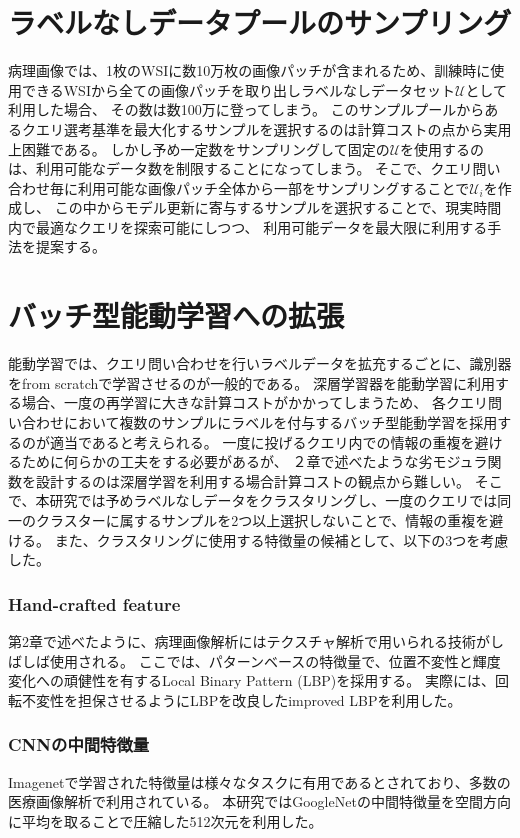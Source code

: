 \section{ラベルなしデータプールのサンプリング}
病理画像では、1枚のWSIに数10万枚の画像パッチが含まれるため、訓練時に使用できるWSIから全ての画像パッチを取り出しラベルなしデータセット$\mathcal{U}$として利用した場合、
その数は数100万に登ってしまう。
このサンプルプールからあるクエリ選考基準を最大化するサンプルを選択するのは計算コストの点から実用上困難である。
しかし予め一定数をサンプリングして固定の$\mathcal{U}$を使用するのは、利用可能なデータ数を制限することになってしまう。
そこで、クエリ問い合わせ毎に利用可能な画像パッチ全体から一部をサンプリングすることで$\mathcal{U}_i$を作成し、
この中からモデル更新に寄与するサンプルを選択することで、現実時間内で最適なクエリを探索可能にしつつ、
利用可能データを最大限に利用する手法を提案する。

\section{バッチ型能動学習への拡張}
能動学習では、クエリ問い合わせを行いラベルデータを拡充するごとに、識別器をfrom scratchで学習させるのが一般的である。
深層学習器を能動学習に利用する場合、一度の再学習に大きな計算コストがかかってしまうため、
各クエリ問い合わせにおいて複数のサンプルにラベルを付与するバッチ型能動学習を採用するのが適当であると考えられる。
一度に投げるクエリ内での情報の重複を避けるために何らかの工夫をする必要があるが、
２章で述べたような劣モジュラ関数を設計するのは深層学習を利用する場合計算コストの観点から難しい。
そこで、本研究では予めラベルなしデータをクラスタリングし、一度のクエリでは同一のクラスターに属するサンプルを2つ以上選択しないことで、情報の重複を避ける。
また、クラスタリングに使用する特徴量の候補として、以下の3つを考慮した。

\subsubsection{Hand-crafted feature}
第2章で述べたように、病理画像解析にはテクスチャ解析で用いられる技術がしばしば使用される。
ここでは、パターンベースの特徴量で、位置不変性と輝度変化への頑健性を有するLocal Binary Pattern (LBP)\cite{ojala2002multiresolution}を採用する。
実際には、回転不変性を担保させるようにLBPを改良したimproved LBPを利用した。

\subsubsection{CNNの中間特徴量}
Imagenetで学習された特徴量は様々なタスクに有用であるとされており、多数の医療画像解析で利用されている。
本研究ではGoogleNet\cite{szegedy2015going}の中間特徴量を空間方向に平均を取ることで圧縮した512次元を利用した。

